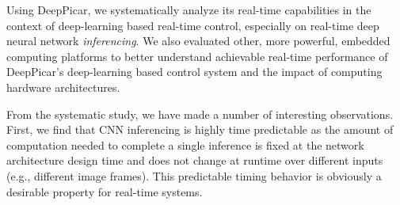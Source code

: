 
Using DeepPicar, we systematically analyze its real-time
capabilities in the context of deep-learning based real-time
control, especially on real-time deep neural network \emph{inferencing}.
We also evaluated other, more powerful, embedded computing
platforms to better understand achievable real-time performance of
DeepPicar's deep-learning based control system and the impact of
computing hardware architectures.

%
%
%
%
%
%
From the systematic study, we have made a number of interesting
observations.
First, we find that CNN inferencing is highly time predictable as the
amount of computation needed to complete a 
single inference is fixed at the network architecture design time and
does not change at runtime over different inputs (e.g., different image
frames). This predictable timing behavior is obviously a desirable
property for real-time systems.

